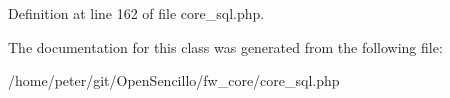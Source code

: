 Definition at line 162 of file core\-\_\-sql.\-php.



The documentation for this class was generated from the following file\-:\begin{DoxyCompactItemize}
\item 
/home/peter/git/\-Open\-Sencillo/fw\-\_\-core/core\-\_\-sql.\-php\end{DoxyCompactItemize}
